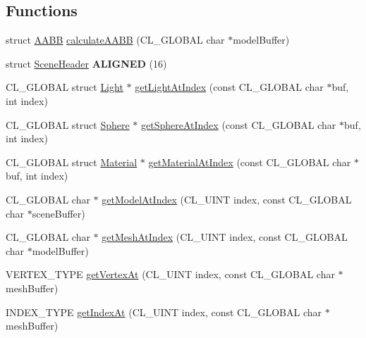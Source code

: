 \subsection*{Functions}
\begin{DoxyCompactItemize}
\item 
struct \hyperlink{struct_a_a_b_b}{A\+A\+BB} \hyperlink{group__g13_ga6fd2da32e675bdc51c669deaa8fc2a72}{calculate\+A\+A\+BB} (C\+L\+\_\+\+G\+L\+O\+B\+AL char $\ast$model\+Buffer)
\item 
struct \hyperlink{struct_scene_header}{Scene\+Header} {\bfseries A\+L\+I\+G\+N\+ED} (16)\hypertarget{group__g13_gafd2ae94bb65568ccc2f52955b76c6e5a}{}\label{group__g13_gafd2ae94bb65568ccc2f52955b76c6e5a}

\item 
C\+L\+\_\+\+G\+L\+O\+B\+AL struct \hyperlink{struct_light}{Light} $\ast$ \hyperlink{group__g13_ga7722fdf6e646b6428dc155128375e34a}{get\+Light\+At\+Index} (const C\+L\+\_\+\+G\+L\+O\+B\+AL char $\ast$buf, int index)
\item 
C\+L\+\_\+\+G\+L\+O\+B\+AL struct \hyperlink{struct_sphere}{Sphere} $\ast$ \hyperlink{group__g13_gab1c9d5464229d9e20cf97414fdcbc039}{get\+Sphere\+At\+Index} (const C\+L\+\_\+\+G\+L\+O\+B\+AL char $\ast$buf, int index)
\item 
C\+L\+\_\+\+G\+L\+O\+B\+AL struct \hyperlink{struct_material}{Material} $\ast$ \hyperlink{group__g13_gac140974adead8370620277bb6e196c34}{get\+Material\+At\+Index} (const C\+L\+\_\+\+G\+L\+O\+B\+AL char $\ast$buf, int index)
\item 
C\+L\+\_\+\+G\+L\+O\+B\+AL char $\ast$ \hyperlink{group__g13_gaa9239ad684cbf8080620660e6545e217}{get\+Model\+At\+Index} (C\+L\+\_\+\+U\+I\+NT index, const C\+L\+\_\+\+G\+L\+O\+B\+AL char $\ast$scene\+Buffer)
\item 
C\+L\+\_\+\+G\+L\+O\+B\+AL char $\ast$ \hyperlink{group__g13_ga5790da37bc707dc0f27eb9a2190d144b}{get\+Mesh\+At\+Index} (C\+L\+\_\+\+U\+I\+NT index, const C\+L\+\_\+\+G\+L\+O\+B\+AL char $\ast$model\+Buffer)
\item 
V\+E\+R\+T\+E\+X\+\_\+\+T\+Y\+PE \hyperlink{group__g13_gae50624ab916b188150e95081b400ef2f}{get\+Vertex\+At} (C\+L\+\_\+\+U\+I\+NT index, const C\+L\+\_\+\+G\+L\+O\+B\+AL char $\ast$mesh\+Buffer)
\item 
I\+N\+D\+E\+X\+\_\+\+T\+Y\+PE \hyperlink{group__g13_ga66a55d590b149e140804695048f537c9}{get\+Index\+At} (C\+L\+\_\+\+U\+I\+NT index, const C\+L\+\_\+\+G\+L\+O\+B\+AL char $\ast$mesh\+Buffer)
\item 

\end{DoxyCompactItemize}
